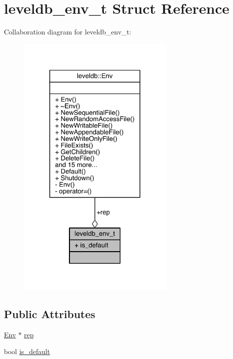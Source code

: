 \hypertarget{structleveldb__env__t}{}\section{leveldb\+\_\+env\+\_\+t Struct Reference}
\label{structleveldb__env__t}


Collaboration diagram for leveldb\+\_\+env\+\_\+t\+:\nopagebreak
\begin{figure}[H]
\begin{center}
\leavevmode
\includegraphics[width=217pt]{structleveldb__env__t__coll__graph}
\end{center}
\end{figure}
\subsection*{Public Attributes}
\begin{DoxyCompactItemize}
\item 
\hyperlink{classleveldb_1_1_env}{Env} $\ast$ \hyperlink{structleveldb__env__t_ad41038b41aebaf7ffba1a4bbfaa8b539}{rep}
\item 
bool \hyperlink{structleveldb__env__t_a53e285385a628e932128aec1f0fe1dae}{is\+\_\+default}
\end{DoxyCompactItemize}


